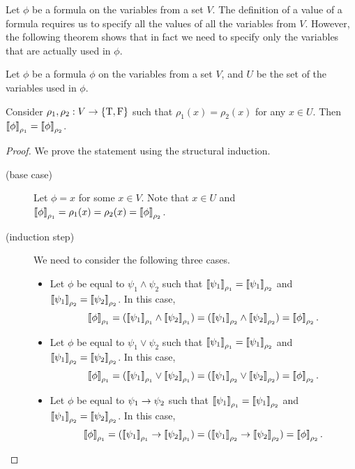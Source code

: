 Let $\phi$ be a formula on the variables from a set $V$. The definition
of a value of a formula requires us to specify all the values of all the
variables from $V$. However, the following theorem shows that in
fact we need to specify only the variables that are actually used in $\phi$.
\begin{theorem}
  Let $\phi$ be a formula $\phi$ on the variables from a set $V$,
  and $U$ be the set of the variables used in $\phi$.

  Consider $\rho_1, \rho_2 : V \to \set{\ltrue, \lfalse}$ such that
  $\rho_1(x) = \rho_2(x)$ for any $x \in U$.
  Then $\left\llbracket {\phi} \right\rrbracket_{\rho_1} = \left\llbracket {\phi} \right\rrbracket_{\rho_2}$.
\end{theorem}
\begin{proof}
  We prove the statement using the structural induction.
  \begin{description}
    \item[(base case)] Let $\phi = x$ for some $x \in V$.
      Note that $x \in U$ and $\left\llbracket {\phi} \right\rrbracket_{\rho_1} = \rho_1(x) =
      \rho_2(x) = \left\llbracket {\phi} \right\rrbracket_{\rho_2}$.
    \item[(induction step)] We need to consider the following three cases.
      \begin{itemize}
        \item Let $\phi$ be equal to $\psi_1 \land \psi_2$ such that
          $\left\llbracket {\psi_1} \right\rrbracket_{\rho_1} = \left\llbracket {\psi_1} \right\rrbracket_{\rho_2}$ and
          $\left\llbracket {\psi_1} \right\rrbracket_{\rho_2} = \left\llbracket {\psi_2} \right\rrbracket_{\rho_2}$.
          In this case,
          \[
            \left\llbracket {\phi} \right\rrbracket_{\rho_1} =
            (\left\llbracket {\psi_1} \right\rrbracket_{\rho_1} \land \left\llbracket {\psi_2} \right\rrbracket_{\rho_1} )=
            (\left\llbracket {\psi_1} \right\rrbracket_{\rho_2} \land \left\llbracket {\psi_2} \right\rrbracket_{\rho_2}) =
            \left\llbracket {\phi} \right\rrbracket_{\rho_2}.
          \]
        \item Let $\phi$ be equal to $\psi_1 \lor \psi_2$ such that
          $\left\llbracket {\psi_1} \right\rrbracket_{\rho_1} = \left\llbracket {\psi_1} \right\rrbracket_{\rho_2}$ and
          $\left\llbracket {\psi_1} \right\rrbracket_{\rho_2} = \left\llbracket {\psi_2} \right\rrbracket_{\rho_2}$.
          In this case,
          \[
            \left\llbracket {\phi} \right\rrbracket_{\rho_1} =
            (\left\llbracket {\psi_1} \right\rrbracket_{\rho_1} \lor \left\llbracket {\psi_2} \right\rrbracket_{\rho_1}) =
            (\left\llbracket {\psi_1} \right\rrbracket_{\rho_2} \lor \left\llbracket {\psi_2} \right\rrbracket_{\rho_2}) =
            \left\llbracket {\phi} \right\rrbracket_{\rho_2}.
          \]
        \item Let $\phi$ be equal to $\psi_1 \rightarrow \psi_2$ such that
          $\left\llbracket {\psi_1} \right\rrbracket_{\rho_1} = \left\llbracket {\psi_1} \right\rrbracket_{\rho_2}$ and
          $\left\llbracket {\psi_1} \right\rrbracket_{\rho_2} = \left\llbracket {\psi_2} \right\rrbracket_{\rho_2}$.
          In this case,
          \[
            \left\llbracket {\phi} \right\rrbracket_{\rho_1} =
            (\left\llbracket {\psi_1} \right\rrbracket_{\rho_1} \rightarrow \left\llbracket {\psi_2} \right\rrbracket_{\rho_1}) =
            (\left\llbracket {\psi_1} \right\rrbracket_{\rho_2} \rightarrow \left\llbracket {\psi_2} \right\rrbracket_{\rho_2}) =
            \left\llbracket {\phi} \right\rrbracket_{\rho_2}.
          \]
      \end{itemize}
  \end{description}
\end{proof}

